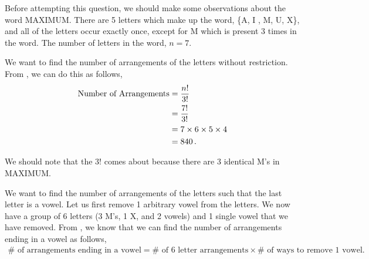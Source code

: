 %
%


\begin{subquestions}
	
\subquestion

Before attempting this question, we should make some observations about the word MAXIMUM. There are 5 letters which make up the word, \{A, I , M, U, X\}, and all of the letters occur exactly once, except for M which is present 3 times in the word. The number of letters in the word, $n=7$.
	
\begin{subsubquestions}
	
\subsubquestion

We want to find the number of arrangements of the letters without restriction. From , we can do this as follows,
\begin{align}
	\text{Number of Arrangements} & = \frac{n!}{3!} \nonumber \\
	                              & = \frac{7!}{3!} \nonumber \\
	                              & = 7 \times 6 \times 5 \times 4 \nonumber \\
	                              & = 840 \,.
\end{align}	
	
We should note that the $3!$ comes about because there are 3 identical M's in MAXIMUM.


\subsubquestion

We want to find the number of arrangements of the letters such that the last letter is a vowel. Let us first remove 1 arbitrary vowel from the letters.
We now have a group of 6 letters (3 M's, 1 X, and 2 vowels) and 1 single vowel that we have removed. From , we know that we can find the number of arrangements ending in a vowel as follows,
\begin{align}
	\text{$\#$ of arrangements ending in a vowel} = \text{$\#$ of 6 letter arrangements} \times \text{$\#$ of ways to remove 1 vowel}. \label{2011:q3:NoVowel}
\end{align}


\end{subsubquestions}
\end{subquestions}
